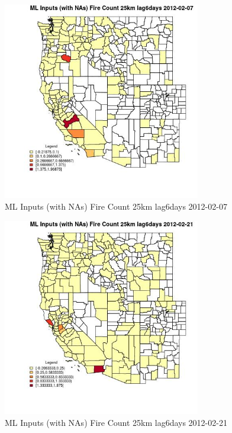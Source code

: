 \begin{figure} 
\centering  
\includegraphics[width=0.77\textwidth]{Code_Outputs/Report_ML_input_PM25_Step4_part_f_de_duplicated_aves_prioritize_24hr_obswNAs_CountyFire_Count_25km_lag6daysMean2012-02-07.jpg} 
\caption{\label{fig:Report_ML_input_PM25_Step4_part_f_de_duplicated_aves_prioritize_24hr_obswNAsCountyFire_Count_25km_lag6daysMean2012-02-07}ML Inputs (with NAs) Fire Count 25km lag6days 2012-02-07} 
\end{figure} 
 

\begin{figure} 
\centering  
\includegraphics[width=0.77\textwidth]{Code_Outputs/Report_ML_input_PM25_Step4_part_f_de_duplicated_aves_prioritize_24hr_obswNAs_CountyFire_Count_25km_lag6daysMean2012-02-21.jpg} 
\caption{\label{fig:Report_ML_input_PM25_Step4_part_f_de_duplicated_aves_prioritize_24hr_obswNAsCountyFire_Count_25km_lag6daysMean2012-02-21}ML Inputs (with NAs) Fire Count 25km lag6days 2012-02-21} 
\end{figure} 
 

